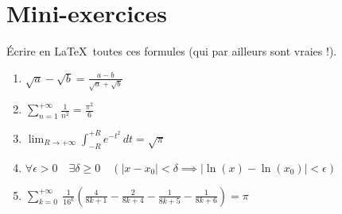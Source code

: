 \section*{Mini-exercices}



\begin{frame}

\begin{miniexercice}
\'Ecrire en \LaTeX\ toutes ces formules (qui par ailleurs sont vraies !).
\begin{enumerate}
  \setlength{\itemsep}{1em}

  \item $\displaystyle \sqrt{a}-\sqrt{b} = \frac{a-b}{\sqrt a + \sqrt b}$
  \item $\displaystyle \sum_{n=1}^{+\infty}{\frac{1}{n^2}} = \frac{\pi^2}{6}$
  \item $\displaystyle \lim_{R\to+\infty} \int_{-R}^{+R} e^{-t^2} \, dt = \sqrt{\pi}$
  \item $\displaystyle \forall \epsilon>0 \quad \exists \delta \ge 0 \quad (|x-x_0|<\delta \implies |\ln(x)-\ln(x_0)|<\epsilon)$
  \item $\displaystyle \sum_{k=0}^{+\infty} \ \frac{1}{16^k} \left(\frac{4}{8k+1}-\frac{2}{8k+4}-\frac{1}{8k+5}-\frac{1}{8k+6} \right) = \pi$

\end{enumerate}
\end{miniexercice}
\end{frame}





